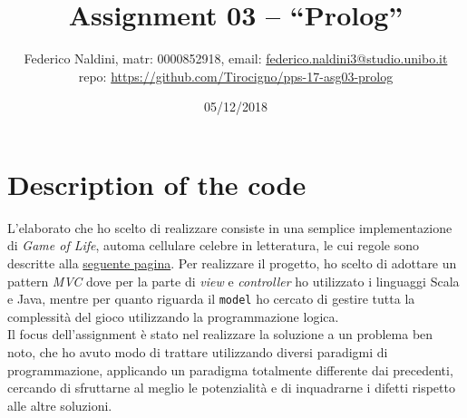 \documentclass[10pt,italian]{article}
\title{\vspace{-70pt}Assignment 03 -- ``Prolog''}
\author{Federico Naldini, matr: 0000852918, email: {\url{federico.naldini3@studio.unibo.it}}\\ repo: {\url{https://github.com/Tirocigno/pps-17-asg03-prolog}}
\date{05/12/2018}}
\begin{document}
\maketitle
\vspace{-30pt}

\section{Description of the code}
L'elaborato che ho scelto di realizzare consiste in una semplice implementazione di \textit{Game of Life}, automa cellulare celebre in letteratura, le cui regole sono descritte alla \href{https://en.wikipedia.org/wiki/Conway\%27s_Game_of_Life#Rules}{seguente pagina}.
Per realizzare il progetto, ho scelto di adottare un pattern \textit{MVC} dove per la parte di \textit{view} e \textit{controller} ho utilizzato i linguaggi Scala e Java, mentre per quanto riguarda il \texttt{model} ho cercato di gestire tutta la complessità del gioco utilizzando la programmazione logica.\\
Il focus dell'assignment è stato nel realizzare la soluzione a un problema ben noto, che ho avuto modo di trattare utilizzando diversi paradigmi di programmazione, applicando un paradigma totalmente differente dai precedenti, cercando di sfruttarne al meglio le potenzialità e di inquadrarne i difetti rispetto alle altre soluzioni.
\end{document}
